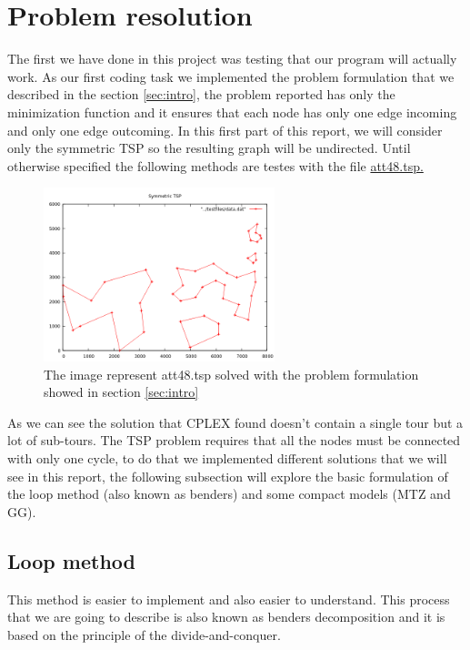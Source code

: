\section{Problem resolution}
The first we have done in this project was testing that our program will actually work. As our first coding task we implemented the problem formulation that we described in the section \ref{sec:intro}, the problem reported has only the minimization function and it ensures that each node has only one edge incoming and only one edge outcoming. In this first part of this report, we will consider only the symmetric TSP so the resulting graph will be undirected. Until otherwise specified the following methods are testes with the file \href{http://comopt.ifi.uni-heidelberg.de/software/TSPLIB95/tsp/}{att48.tsp.}

\begin{figure}[h]
	\centering
	\includegraphics[width=0.6\textwidth]{images/symmetric_with_tours}
	\caption{The image represent att48.tsp solved with the problem formulation showed in section \ref{sec:intro}}
\end{figure}

As we can see the solution that CPLEX found doesn't contain a single tour but a lot of sub-tours. The TSP problem requires that all the nodes must be connected with only one cycle, to do that we implemented different solutions that we will see in this report, the following subsection will explore the basic formulation of the loop method (also known as benders) and some compact models (MTZ and GG).

\subsection{Loop method}
\label{sec:loop}
This method is easier to implement and also easier to understand. This process that we are going to describe is also known as benders decomposition and it is based on the principle of the divide-and-conquer.

